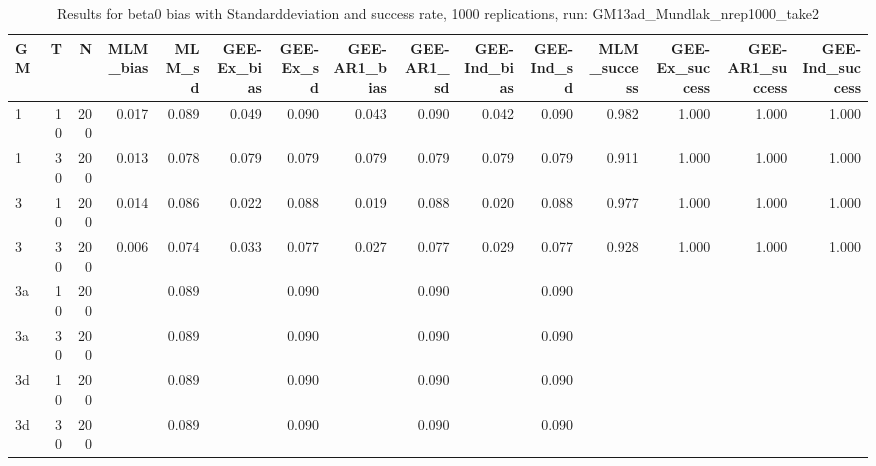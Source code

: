 \begin{table}[ht]
\centering
\begin{tabular}{lrrrrrrrrrrrrrr}
  \hline
GM & T & N & MLM\_bias & MLM\_sd & GEE-Ex\_bias & GEE-Ex\_sd & GEE-AR1\_bias & GEE-AR1\_sd & GEE-Ind\_bias & GEE-Ind\_sd & MLM\_success & GEE-Ex\_success & GEE-AR1\_success & GEE-Ind\_success \\ 
  \hline
1 & 10 & 200 & 0.017 & 0.089 & 0.049 & 0.090 & 0.043 & 0.090 & 0.042 & 0.090 & 0.982 & 1.000 & 1.000 & 1.000 \\ 
  1 & 30 & 200 & 0.013 & 0.078 & 0.079 & 0.079 & 0.079 & 0.079 & 0.079 & 0.079 & 0.911 & 1.000 & 1.000 & 1.000 \\ 
  3 & 10 & 200 & 0.014 & 0.086 & 0.022 & 0.088 & 0.019 & 0.088 & 0.020 & 0.088 & 0.977 & 1.000 & 1.000 & 1.000 \\ 
  3 & 30 & 200 & 0.006 & 0.074 & 0.033 & 0.077 & 0.027 & 0.077 & 0.029 & 0.077 & 0.928 & 1.000 & 1.000 & 1.000 \\ 
  3a & 10 & 200 &  & 0.089 &  & 0.090 &  & 0.090 &  & 0.090 &  &  &  &  \\ 
  3a & 30 & 200 &  & 0.089 &  & 0.090 &  & 0.090 &  & 0.090 &  &  &  &  \\ 
  3d & 10 & 200 &  & 0.089 &  & 0.090 &  & 0.090 &  & 0.090 &  &  &  &  \\ 
  3d & 30 & 200 &  & 0.089 &  & 0.090 &  & 0.090 &  & 0.090 &  &  &  &  \\ 
   \hline
\end{tabular}
\caption{Results for beta0 bias with Standarddeviation and success rate, 1000 replications, run: GM13ad_Mundlak_nrep1000_take2} 
\label{tab:beta0_bias_sd_success}
\end{table}
